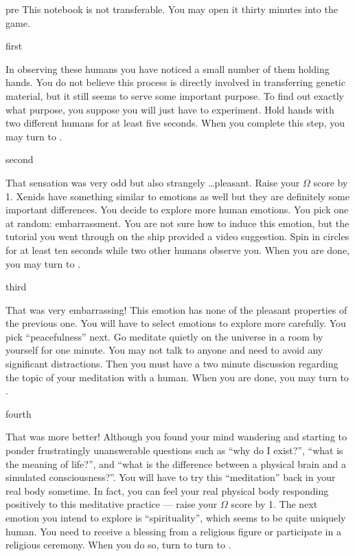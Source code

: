 \documentclass[notebook]{guildcamp1}
\begin{document}
\startnotebook{\nBrainDamage{}}

\begin{page}{pre}
This notebook is not transferable. You may open it thirty minutes into the game.
\end{page}

\begin{page}{first}

In observing these humans you have noticed a small number of them holding hands. You do not believe this process is directly involved in transferring genetic material, but it still seems to serve some important purpose. To find out exactly what purpose, you suppose you will just have to experiment. Hold hands with two different humans for at least five seconds. When you complete this step, you may turn to .

\end{page}

\begin{page}{second}

That sensation was very odd but also strangely \ldots pleasant. Raise your $\Omega$ score by 1. Xenids have something similar to emotions as well but they are definitely some important differences. You decide to explore more human emotions. You pick one at random: embarrassment. You are not sure how to induce this emotion, but the tutorial you went through on the ship provided a video suggestion. Spin in circles for at least ten seconds while two other humans observe you. When you are done, you may turn to .

\end{page}

\begin{page}{third}

That was very embarrassing! This emotion has none of the pleasant properties of the previous one. You will have to select emotions to explore more carefully. You pick ``peacefulness'' next. Go meditate quietly on the universe in a room by yourself for one minute. You may not talk to anyone and need to avoid any significant distractions. Then you must have a two minute discussion regarding the topic of your meditation with a human. When you are done, you may turn to .

\end{page}

\begin{page}{fourth}

That was more better! Although you found your mind wandering and starting to ponder frustratingly unanswerable questions such as ``why do I exist?'', ``what is the meaning of life?'', and ``what is the difference between a physical brain and a simulated consciousness?''. You will have to try this ``meditation'' back in your real body sometime. In fact, you can feel your real physical body responding positively to this meditative practice --- raise your $\Omega$ score by 1. The next emotion you intend to explore is ``spirituality'', which seems to be quite uniquely human. You need to receive a blessing from a religious figure or participate in a religious ceremony. When you do so, turn to turn to .

\end{page}
\end{document}
